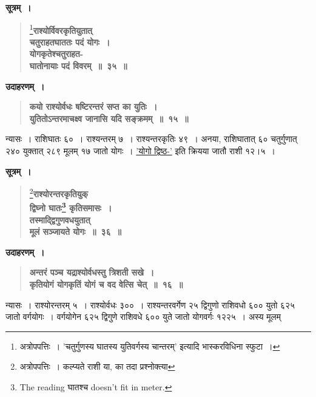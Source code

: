\documentclass[11pt, openany]{book}
\begin{document}
\begin{sloppypar}
\begin{center}
\textbf{सूत्रम्~।}
\end{center}
\vspace{-5mm}

 \label{1.35}
\begin{quote}
\renewcommand{\thefootnote}{१}\footnote{अत्रोपपत्तिः~। {\color{violet}'चतुर्गुणस्य घातस्य युतिवर्गस्य चान्तरम्'} इत्यादि {\color{violet}भास्कर}विधिना स्फुटा~।}{\large \textbf{{\color{purple}राश्योर्विवरकृतियुतात् \\
चतुराहतघाततः पदं योगः~।\\ 
योगकृतेश्चतुराहत-\\
घातोनायाः पदं विवरम्~॥~३५~॥}}}
\end{quote}

\noindent \textbf{उदाहरणम्~।}

 \label{Ex 1.15}
\begin{quote}
\textbf{{\color{red}कयो राश्योर्वधः षष्टिरन्तरं सप्त का युतिः~।\\ 
युतितोऽन्तरमाचक्ष्व जानासि यदि सङ्क्रमम्~॥~१५~॥}}
\end{quote}

न्यासः~। राशिघातः ६०~। राश्यन्तरम् ७~। राश्यन्तरकृतिः ४९~। अनया, राशिघातात् ६० चतुर्गुणात् २४० युक्तात् २८९ मूलम् १७ जातो योगः~। \hyperref[1.31]{'योगो द्विष्ठ-'} इति क्रियया जातौ राशी १२।५~।
\vspace{2mm}

\begin{center}
\textbf{सूत्रम्~।}
\end{center}
\vspace{-5mm}

 \label{1.36}
\begin{quote}
\renewcommand{\thefootnote}{२}\footnote{अत्रोपपत्तिः~। कल्प्यते राशी या, का तदा प्रश्नोक्त्या}{\large \textbf{{\color{purple}राश्योरन्तरकृतियुक् \\
द्विघ्नो घातः\renewcommand{\thefootnote}{३}\footnote{The reading घातश्च doesn’t fit in meter.} कृतिसमासः~।\\
तस्माद्द्विगुणवधयुतात् \\
मूलं सञ्जायते योगः~॥~३६~॥}}}
\end{quote}

\noindent \textbf{उदाहरणम्~।}

 \label{Ex 1.16}
\begin{quote}
\textbf{{\color{red}अन्तरं पञ्च यद्राश्योर्वधस्तु त्रिशती सखे~।\\ 
कृतियोगं योगकृतिं योगं च वद वेत्सि चेत्~॥~१६~॥}}
\end{quote}

न्यासः~। राश्योरन्तरम् ५~। राश्योर्वधः ३००~। राश्यन्तरवर्गेण २५ द्विगुणो राशिवधो ६०० युतो ६२५ जातो वर्गयोगः~। वर्गयोगेन ६२५ द्विगुणे राशिवधे ६०० युते जातो योगवर्गः १२२५~। अस्य मूलम्
\end{sloppypar}
\end{document}
